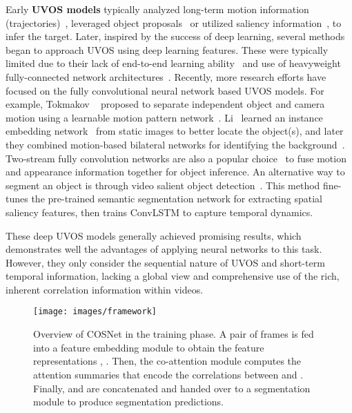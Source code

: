 \documentclass[10pt,twocolumn,letterpaper]{article}
\begin{document}
Early \textbf{UVOS models} typically analyzed long-term motion information (trajectories)~\cite{Brox2010,DBLP:conf/iccv/OchsB11,DBLP:conf/cvpr/FragkiadakiZS12,DBLP:conf/iccv/PapazoglouF13,DBLP:conf/iccv/KeuperAB15,DBLP:journals/pami/OchsMB14},  leveraged object proposals~\cite{lee2011key,ma2012,zhang2013,DBLP:conf/cvpr/KohK17,fu2014object,Koh_2018_ECCV} or utilized saliency information~\cite{DBLP:conf/cvpr/WangSP15,DBLP:conf/bmvc/FaktorI14,tsai2016semantic,hu2018unsupervised}, to infer the target. Later, inspired by the success of deep learning, several methods~\cite{fragkiadaki2015learning,DBLP:conf/cvpr/Tsai0B16,pathak2017learning} began to approach UVOS using deep learning features. These were typically limited due to their lack of end-to-end learning ability~\cite{DBLP:conf/cvpr/Tsai0B16} and use of heavyweight fully-connected network architectures~\cite{fragkiadaki2015learning,pathak2017learning}. Recently, more research efforts have focused on the fully convolutional neural network based UVOS models. For example, Tokmakov \etal~\cite{DBLP:conf/cvpr/TokmakovAS17} proposed to separate independent object and camera motion using a learnable motion pattern network~\cite{DBLP:conf/cvpr/TokmakovAS17}. Li \etal~learned an instance embedding network~\cite{Li_2018_CVPR} from static images to better locate the object(s), and later they combined motion-based bilateral networks for identifying the background~\cite{Li_2018_ECCV1}.  Two-stream fully convolution networks are also a popular choice~\cite{cheng2017segflow,jain2017fusionseg,DBLP:conf/iccv/TokmakovAS17,Li_2018_CVPR} to fuse motion and appearance information together for object inference.
An alternative way to segment an object is through video salient object detection~\cite{Song_2018_ECCV}. This method fine-tunes the pre-trained semantic segmentation network for extracting spatial saliency features, then trains ConvLSTM  to capture temporal dynamics. 

These deep UVOS models generally achieved promising results, which demonstrates well the advantages of applying neural networks to this task. However, they only consider the sequential nature of UVOS and short-term temporal information, lacking a global view and comprehensive use of the rich, inherent correlation information within videos.
\begin{figure*}[t]
	\centering
	\texttt{[image: images/framework]}
	\caption{\small Overview of COSNet in the training phase. A pair of frames  is fed into a feature embedding module to obtain the feature representations , . Then, the co-attention module computes the attention summaries that encode the correlations between  and . Finally,  and  are concatenated and handed over to a segmentation module to produce segmentation predictions.  }
\vspace*{-4pt}
	\label{fig:framework}
\end{figure*}
\end{document}
